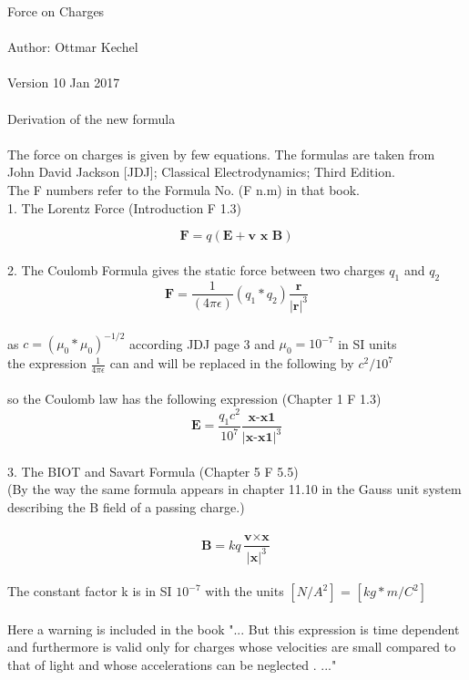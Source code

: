 \documentclass[10pt,titlepage]{article}
\begin{document}
\author{Ottmar K. Kechel}
\date{Datum}


{\large Force on Charges}\\\\
Author: Ottmar Kechel        
\\
\\
Version 10 Jan 2017\\\\
Derivation of the new formula 
\\\\
The force on charges is given by few equations.
The formulas are taken from 
\\John David Jackson [JDJ]; Classical Electrodynamics; Third Edition.
\\The F numbers refer to the Formula No. (F n.m) in that book.
\\

1. The Lorentz Force (Introduction F 1.3)


\begin{equation}
\textbf{F} = q(\textbf{E}+\textbf{v }\textbf{x}\textbf{ B})
\end{equation}\\

2. The Coulomb Formula gives the static force between two charges $q_1$ and $q_2$ 
\\

\begin{equation}
\textbf{F} = \frac{1}{(4\pi \epsilon)} (q_1*q_2)\frac{\textbf{r}}{\vert\textbf{r}\vert^3}
\end{equation}\\

as  $c = ( \mu_0 * \mu_0)^{-1/2}$        according JDJ page 3 and $\mu_0=10^{-7}$ in SI units
\\
the expression $\frac{1}{4\pi\epsilon}$ can and will be replaced in the following by $c^2/10^7$\\
\\
so the Coulomb law has the following expression (Chapter 1  F 1.3)
\begin{equation}
\textbf{E} = \frac{ q_1c^2}{10^7}\frac{\textbf{x-x1}}{\vert\textbf{x-x1}\vert^3}
\end{equation}\\

3. The BIOT and Savart Formula (Chapter 5  F 5.5)
\\(By the way the same formula appears in chapter 11.10 in the Gauss unit system describing the B field of a passing charge.)\\
\\
\begin{equation}
\textbf{B} = kq \frac{\textbf{v} \times \textbf{x}}{\vert\textbf{x}\vert^3}
\end{equation}
\\
The constant factor k is in SI  $10^{-7}$ with the units $[N/A^2]$ =  $[kg*m/C^2]$
\\\\
Here a warning is included in the book
"... But this expression is time dependent and furthermore is valid only for charges whose velocities are small compared to that of light and whose accelerations can be neglected .  ..."
\end{document}
